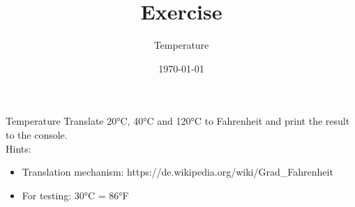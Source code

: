


\title{Exercise}
\subtitle{Temperature}
\date{\today}




\begin{frame}
    \titlepage
\end{frame}

\begin{frame}{Temperature}
    Translate 20°C, 40°C and 120°C to Fahrenheit and print the result to the console.\\
    Hints:
    \begin{itemize}
        \item Translation mechanism: https://de.wikipedia.org/wiki/Grad_Fahrenheit
        \item For testing: 30°C = 86°F
    \end{itemize}
\end{frame}



